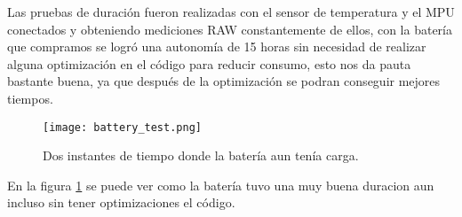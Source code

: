 Las pruebas de duración fueron realizadas con el sensor de temperatura y el MPU conectados y obteniendo mediciones RAW
constantemente de ellos, con la batería que compramos se logró una autonomía de 15 horas sin necesidad de realizar alguna
optimización en el código para reducir consumo, esto nos da pauta bastante buena, ya que después de la optimización se
podran conseguir mejores tiempos.

\begin{figure}[htp!]
    \centering
    \texttt{[image: battery\_test.png]}
    \caption{Dos instantes de tiempo donde la batería aun tenía carga. }
    \label{fig: battery_test}
\end{figure}
\FloatBarrier

En la figura \ref{fig: battery_test} se puede ver como la batería tuvo una muy buena duracion aun incluso sin tener optimizaciones
el código.

